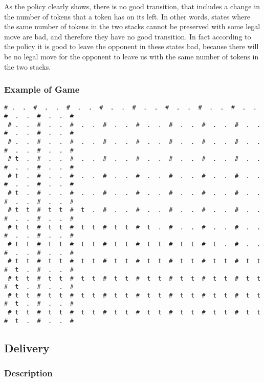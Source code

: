 \documentclass[a4paper]{article}
\begin{document}
As the policy clearly shows, there is no good transition, that includes a change in the number of tokens that a token has on its left. In other words, states where the same number of tokens in the two stacks cannot be preserved with some legal move are bad, and therefore they have no good transition. In fact according to the policy it is good to leave the opponent in these states bad, because there will be no legal move for the opponent to leave us with the same number of tokens in the two stacks.


\subsubsection{Example of Game}
\begin{Verbatim}[fontsize=\footnotesize]
 # .  .  #  .  .  #  .  .  #  .  .  #  .  .  #  .  .  #  .  .  #  .  .  #  .  .  #  .  .  #
 # .  .  #  .  .  #  .  .  #  .  .  #  .  .  #  .  .  #  .  .  #  .  .  #  .  .  #  .  .  #
 # .  .  #  .  .  #  .  .  #  .  .  #  .  .  #  .  .  #  .  .  #  .  .  #  .  .  #  .  .  #
 # t  .  #  .  .  #  .  .  #  .  .  #  .  .  #  .  .  #  .  .  #  .  .  #  .  .  #  .  .  #
 # t  .  #  .  .  #  .  .  #  .  .  #  .  .  #  .  .  #  .  .  #  .  .  #  .  .  #  .  .  #
 # t  .  #  .  .  #  .  .  #  .  .  #  .  .  #  .  .  #  .  .  #  .  .  #  .  .  #  .  .  #
 # t  t  #  t  t  #  t  .  #  .  .  #  .  .  #  .  .  #  .  .  #  .  .  #  .  .  #  .  .  #
 # t  t  #  t  t  #  t  t  #  t  t  #  t  .  #  .  .  #  .  .  #  .  .  #  .  .  #  .  .  #
 # t  t  #  t  t  #  t  t  #  t  t  #  t  t  #  t  t  #  t  .  #  .  .  #  .  .  #  .  .  #
 # t  t  #  t  t  #  t  t  #  t  t  #  t  t  #  t  t  #  t  t  #  t  t  #  t  .  #  .  .  #
 # t  t  #  t  t  #  t  t  #  t  t  #  t  t  #  t  t  #  t  t  #  t  t  #  t  .  #  .  .  #
 # t  t  #  t  t  #  t  t  #  t  t  #  t  t  #  t  t  #  t  t  #  t  t  #  t  .  #  .  .  #
 # t  t  #  t  t  #  t  t  #  t  t  #  t  t  #  t  t  #  t  t  #  t  t  #  t  .  #  .  .  #
\end{Verbatim}

\subsection{Delivery}
\subsubsection{Description}
\end{document}
